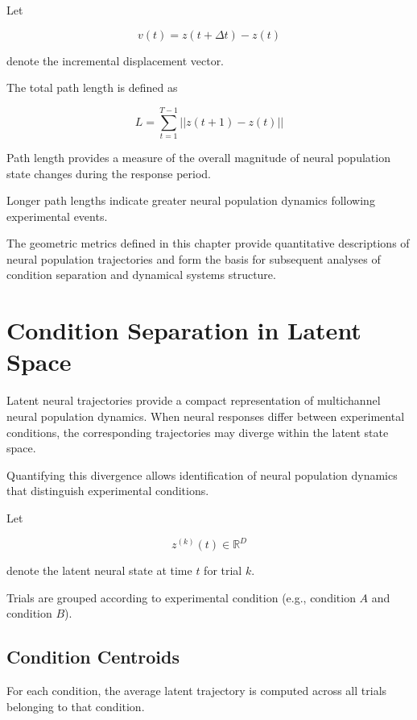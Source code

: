 \documentclass[11pt]{report}
\begin{document}
Let

\begin{equation}
v(t) = z(t+\Delta t) - z(t)
\end{equation}

denote the incremental displacement vector.

The total path length is defined as

\begin{equation}
L =
\sum_{t=1}^{T-1}
||z(t+1) - z(t)||
\end{equation}

Path length provides a measure of the overall magnitude of neural
population state changes during the response period.

Longer path lengths indicate greater neural population dynamics
following experimental events.

The geometric metrics defined in this chapter provide quantitative
descriptions of neural population trajectories and form the basis for
subsequent analyses of condition separation and dynamical systems
structure.


\chapter{Condition Separation in Latent Space}

Latent neural trajectories provide a compact representation of
multichannel neural population dynamics. When neural responses differ
between experimental conditions, the corresponding trajectories may
diverge within the latent state space.

Quantifying this divergence allows identification of neural population
dynamics that distinguish experimental conditions.

Let

\begin{equation}
z^{(k)}(t) \in \mathbb{R}^{D}
\end{equation}

denote the latent neural state at time $t$ for trial $k$.

Trials are grouped according to experimental condition
(e.g., condition $A$ and condition $B$).

\section{Condition Centroids}

For each condition, the average latent trajectory is computed across
all trials belonging to that condition.
\end{document}
